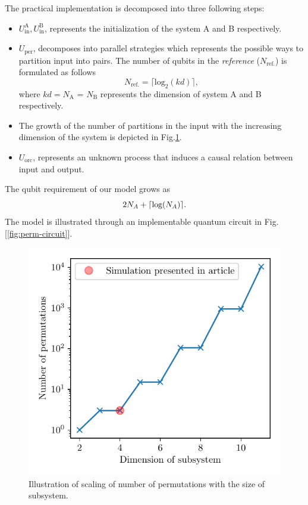\documentclass[%
 aps,
 jmp,%
 amsmath,amssymb,
 reprint,%
]{revtex4-2}
\DeclarePairedDelimiter{\ceil}{\lceil}{\rceil}
\begin{document}
The practical implementation is decomposed into three following steps:
\begin{itemize}
	\item $ U_\textrm{in}^\textrm{A}, U_\textrm{in}^\textrm{B} $, represents the initialization of the system A and B respectively.
	\item $U_\textrm{per}$, decomposes into parallel strategies which represents the possible ways to partition input into pairs.
	The number of qubits in the \textit{reference} ($N_{\textrm{ref.}}$) is formulated as follows
	\begin{equation}
	N_{\textrm{ref.}} = \lceil \textrm{log}_2 (kd) \rceil,
	\end{equation}
	where $kd = N_\textrm{A}$ = $N_\textrm{B}$ represents the dimension of system A and B respectively.
	\item The growth of the number of partitions in the input with the increasing dimension of the system is depicted in Fig.\ref{fig:permutation-resource}.
	\item $U_\textrm{orc}$, represents an unknown process that induces a causal relation between input and output.
\end{itemize}
The qubit requirement of our model grows as
\begin{equation}
2N_A + \ceil{\log( N_A )}. 
\end{equation}
The model is illustrated through an implementable quantum circuit in Fig.[\ref{fig:perm-circuit}].
\begin{figure}[tbh!]
	\centering
	\includegraphics[width = \linewidth]{plot/numb_of_perm}
	\caption{Illustration of scaling of number of permutations with the size of subsystem.}
	\label{fig:permutation-resource}
\end{figure}
\end{document}
